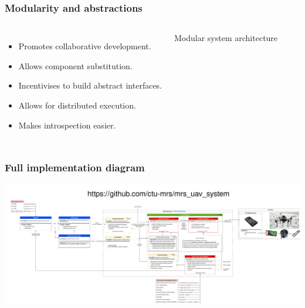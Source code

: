 \documentclass[aspectratio=169]{beamer}
\begin{document}


\begin{frame}
\frametitle{Modularity and abstractions}

\begin{columns}[c]


\begin{itemize}
  \item Promotes collaborative development.
  \item Allows component substitution.
  \item Incentivises to build abstract interfaces.
  \item Allows for distributed execution.
  \item Makes introspection easier.
\end{itemize}


\begin{block}{Modular system architecture}
  \begin{adjustbox}{max totalsize={1.0\textwidth}{.65\textheight}, center}
    
  \end{adjustbox}
\end{block}

\end{columns}

\end{frame}

\begin{frame}
\frametitle{Full implementation diagram}

  \includegraphics[width=1.0\textwidth]{./fig/full_diagram.jpg}

\end{frame}

\end{document}
